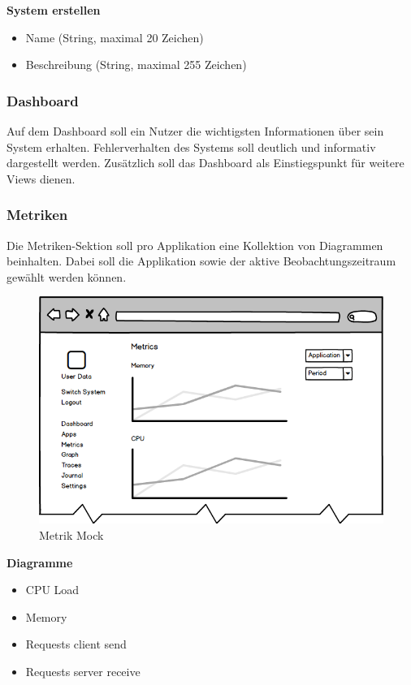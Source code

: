 \textbf{System erstellen}

\begin{itemize}
\item Name (String, maximal 20 Zeichen)
\item Beschreibung (String, maximal 255 Zeichen)
\end{itemize}


\subsubsection{Dashboard}

Auf dem Dashboard soll ein Nutzer die wichtigsten Informationen über sein System erhalten.
Fehlerverhalten des Systems soll deutlich und informativ dargestellt werden.
Zusätzlich soll das Dashboard als Einstiegspunkt für weitere Views dienen.

\subsubsection{Metriken}

Die Metriken-Sektion soll pro Applikation eine Kollektion von Diagrammen beinhalten.
Dabei soll die Applikation sowie der aktive Beobachtungszeitraum gewählt werden können.

\begin{figure}[h]
 \centering
 \includegraphics[width=0.6\linewidth]{kapitel1/mocks/metrics.png}
 \caption{Metrik Mock}
  \label{fig:metrics}
\end{figure}

\textbf{Diagramme}

\begin{itemize}
\item CPU Load
\item Memory
\item Requests client send
\item Requests server receive
\end{itemize}


